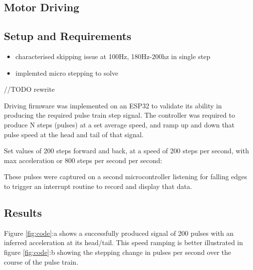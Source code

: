 \subsection{Motor Driving}

\subsection{Setup and Requirements}

\begin{itemize}
    \item characterised skipping issue at 100Hz, 180Hz-200hz in single step
    \item implemted micro stepping to solve
\end{itemize}

//TODO rewrite

Driving firmware was implemented on an ESP32 to validate its ability in producing the required pulse train step signal. The controller was required to produce N steps (pulses) at a set average speed, and ramp up and down that pulse speed at the head and tail of that signal.

Set values of 200 steps forward and back, at a speed of 200 steps per second, with max acceleration or 800 steps per second per second:

These pulses were captured on a second microcontroller listening for falling edges to trigger an interrupt routine to record and display that data.

\subsection{Results}

Figure \ref{fig:code}:a shows a successfully produced signal of 200 pulses with an inferred acceleration at its head/tail. This speed ramping is better illustrated in figure \ref{fig:code}:b showing the stepping change in pulses per second over the course of the pulse train.

